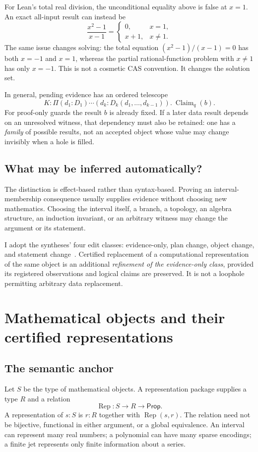 \documentclass[11pt,a4paper]{article}
\newcommand{\Rep}{\operatorname{Rep}}
\newcommand{\Claim}{\operatorname{Claim}}
\theoremstyle{definition}
\theoremstyle{remark}
\begin{document}
For Lean's total real division, the unconditional equality above is false at $x=1$. An exact all-input result can instead be
\[
\frac{x^2-1}{x-1}=
\begin{cases}0,&x=1,\\x+1,&x\ne1.\end{cases}
\]
The same issue changes solving: the total equation $(x^2-1)/(x-1)=0$ has both $x=-1$ and $x=1$, whereas the partial rational-function problem with $x\ne1$ has only $x=-1$. This is not a cosmetic CAS convention. It changes the solution set.

In general, pending evidence has an ordered telescope
\[
K:\Pi(d_1:D_1)\cdots(d_k:D_k(d_1,\ldots,d_{k-1})).\ \Claim_q(b).
\]
For proof-only guards the result $b$ is already fixed. If a later data result depends on an unresolved witness, that dependency must also be retained: one has a \emph{family} of possible results, not an accepted object whose value may change invisibly when a hole is filled.

\subsection{What may be inferred automatically?}
The distinction is effect-based rather than syntax-based. Proving an interval-membership consequence usually supplies evidence without choosing new mathematics. Choosing the interval itself, a branch, a topology, an algebra structure, an induction invariant, or an arbitrary witness may change the argument or its statement.

I adopt the syntheses' four edit classes: evidence-only, plan change, object change, and statement change~\cite{synA}. Certified replacement of a computational representation of the same object is an additional \emph{refinement of the evidence-only class}, provided its registered observations and logical claims are preserved. It is not a loophole permitting arbitrary data replacement.

\section{Mathematical objects and their certified representations}\label{sec:rep}
\subsection{The semantic anchor}
Let $S$ be the type of mathematical objects. A representation package supplies a type $R$ and a relation
\[
\Rep:S\to R\to\mathsf{Prop}.
\]
A representation of $s:S$ is $r:R$ together with $\Rep(s,r)$. The relation need not be bijective, functional in either argument, or a global equivalence. An interval can represent many real numbers; a polynomial can have many sparse encodings; a finite jet represents only finite information about a series.
\end{document}
